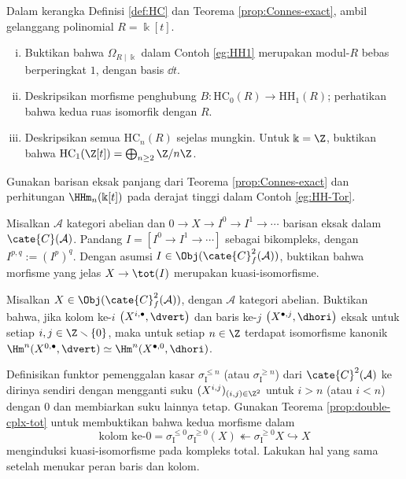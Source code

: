 \begin{Exercises}
	\item Dalam kerangka Definisi \ref{def:HC} dan Teorema
	\ref{prop:Connes-exact}, ambil gelanggang polinomial $R=\Bbbk[t]$.
	\begin{enumerate}[(i)]
		\item Buktikan bahwa $\Omega_{R\mid\Bbbk}$ dalam Contoh
		\ref{eg:HH1} merupakan modul-$R$ bebas berperingkat $1$, dengan basis
		$\dd t$.
		\item Deskripsikan morfisme penghubung
		$B:\mathrm{HC}_0(R)\to\mathrm{HH}_1(R)$; perhatikan bahwa kedua ruas
		isomorfik dengan $R$.
		\item Deskripsikan semua $\mathrm{HC}_n(R)$ sejelas mungkin. Untuk
		$\Bbbk=\Z$, buktikan bahwa
		$\mathrm{HC}_1(\Z[t])=\bigoplus_{n\geq2}\Z/n\Z$.
	\end{enumerate}
	\begin{hint}
		Gunakan barisan eksak panjang dari Teorema
		\ref{prop:Connes-exact} dan perhitungan $\HHm_n(\Bbbk[t])$ pada derajat
		tinggi dalam Contoh \ref{eg:HH-Tor}.
	\end{hint}

	\item Misalkan $\mathcal{A}$ kategori abelian dan
	$0\to X\to I^0\to I^1\to\cdots$ barisan eksak dalam
	$\cate{C}(\mathcal{A})$. Pandang
	$I=[I^0\to I^1\to\cdots]$ sebagai bikompleks, dengan
	$I^{p,q}:=(I^p)^q$. Dengan asumsi
	$I\in\Obj(\cate{C}^2_f(\mathcal{A}))$, buktikan bahwa morfisme yang jelas
	$X\to\tot(I)$ merupakan kuasi-isomorfisme.

	\item Misalkan $X\in\Obj(\cate{C}^2_f(\mathcal{A}))$, dengan
	$\mathcal{A}$ kategori abelian. Buktikan bahwa, jika kolom ke-$i$
	$\left(X^{i,\bullet},\dvert\right)$ dan baris ke-$j$
	$\left(X^{\bullet,j},\dhori\right)$ eksak untuk setiap
	$i,j\in\Z\smallsetminus\{0\}$, maka untuk setiap $n\in\Z$ terdapat
	isomorfisme kanonik
	$\Hm^n(X^{0,\bullet},\dvert)\simeq
	\Hm^n(X^{\bullet,0},\dhori)$.

	\begin{hint}
		Definisikan funktor pemenggalan kasar
		$\sigma_{\mathrm{I}}^{\leq n}$ (atau
		$\sigma_{\mathrm{I}}^{\geq n}$) dari
		$\cate{C}^2(\mathcal{A})$ ke dirinya sendiri dengan mengganti suku
		$(X^{i,j})_{(i,j)\in\Z^2}$ untuk $i>n$ (atau $i<n$) dengan $0$ dan
		membiarkan suku lainnya tetap. Gunakan Teorema
		\ref{prop:double-cplx-tot} untuk membuktikan bahwa kedua morfisme dalam
		\[
			\text{kolom ke-$0$}
			=\sigma_{\mathrm{I}}^{\leq0}\sigma_{\mathrm{I}}^{\geq0}(X)
			\twoheadleftarrow
			\sigma_{\mathrm{I}}^{\geq0}X
			\hookrightarrow X
		\]
		menginduksi kuasi-isomorfisme pada kompleks total. Lakukan hal yang
		sama setelah menukar peran baris dan kolom.
	\end{hint}


\end{Exercises}
